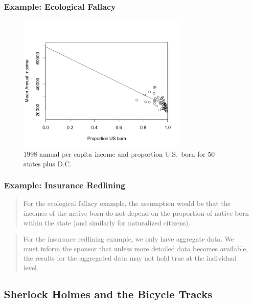 \documentclass[hyperref={colorlinks=false},compress,handout,10pt]{beamer}
\begin{document}
\begin{frame}
    \frametitle{Example: Ecological Fallacy}
    \begin{figure}
        \centering
        \caption{1998 annual per capita income and proportion U.S.~born for 50
        states plus D.C.}
        \includegraphics[width=0.75\textwidth]{images/FigureFarawayFigure11dot1b.png}
    \end{figure}
\end{frame}

\begin{frame}[fragile]
    \frametitle{Example: Insurance Redlining}
    \begin{verse}
For the ecological fallacy example, 
the assumption would be that the incomes of 
the native born do not depend on the proportion of native 
born within the state (and similarly for naturalized citizens).
    \end{verse}
    \vskip0.5in
    \begin{verse}
        For the insurance redlining example, we only have aggregate data.  
        We must inform the sponsor that unless more detailed data becomes
        available, the results for the aggregated data may not hold true 
        at the individual level. 
    \end{verse}
\end{frame}


\subsection{Sherlock Holmes and the Bicycle Tracks}
\end{document}
